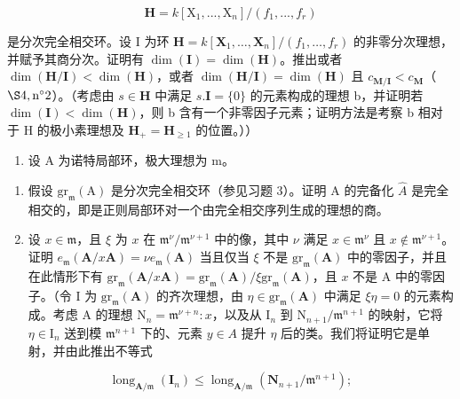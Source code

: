 \[
\mathbf {H} = k [ \mathrm{X} _ {1},..., \mathrm{X} _ {n} ] / (f _ {1},..., f _ {r})
\]

  是分次完全相交环。设 I 为环 \(\mathbf{H} = k[\mathbf{X}_1, \ldots, \mathbf{X}_n] / (f_1, \ldots, f_r)\) 的非零分次理想，并赋予其商分次。证明有 \(\dim(\mathbf{I}) = \dim(\mathbf{H})\)。推出或者 \(\dim(\mathbf{H}/\mathbf{I}) < \dim(\mathbf{H})\)，或者 \(\dim(\mathbf{H}/\mathbf{I}) = \dim(\mathbf{H})\) 且 \(c_{\mathbf{M}/\mathbf{I}} < c_{\mathbf{M}}\)（\(\S 4, \text{n}^{\circ} 2\)）。（考虑由 \(s \in \mathbf{H}\) 中满足 \(s.\mathbf{I} = \{0\}\) 的元素构成的理想 b，并证明若 \(\dim(\mathbf{I}) < \dim(\mathbf{H})\)，则 b 含有一个非零因子元素；证明方法是考察 b 相对于 H 的极小素理想及 \(\mathbf{H}_{+} = \mathbf{H}_{\geqslant 1}\) 的位置。））

\begin{enumerate}
\def\labelenumi{\arabic{enumi})}
\setcounter{enumi}{3}
\tightlist
\item
  设 A 为诺特局部环，极大理想为 m。
\end{enumerate}

\begin{enumerate}
\def\labelenumi{\alph{enumi})}
\item
  假设 \(\mathrm{gr}_{\mathfrak{m}}(\mathrm{A})\) 是分次完全相交环（参见习题 3）。证明 A 的完备化 \(\widehat{A}\) 是完全相交的，即是正则局部环对一个由完全相交序列生成的理想的商。
\item
  设 \(x \in \mathfrak{m}\)，且 \(\xi\) 为 \(x\) 在 \(\mathfrak{m}^{\nu}/\mathfrak{m}^{\nu+1}\) 中的像，其中 \(\nu\) 满足 \(x \in \mathfrak{m}^{\nu}\) 且 \(x \notin \mathfrak{m}^{\nu+1}\)。证明 \(e_{\mathfrak{m}}(\mathbf{A}/x\mathbf{A}) = \nu e_{\mathfrak{m}}(\mathbf{A})\) 当且仅当 \(\xi\) 不是 \(\mathrm{gr}_{\mathfrak{m}}(\mathbf{A})\) 中的零因子，并且在此情形下有 \(\mathrm{gr}_{\mathfrak{m}}(\mathbf{A}/x\mathbf{A}) = \mathrm{gr}_{\mathfrak{m}}(\mathbf{A})/\xi\mathrm{gr}_{\mathfrak{m}}(\mathbf{A})\)，且 \(x\) 不是 A 中的零因子。（令 I 为 \(\mathrm{gr}_{\mathfrak{m}}(\mathbf{A})\) 的齐次理想，由 \(\eta \in \mathrm{gr}_{\mathfrak{m}}(\mathbf{A})\) 中满足 \(\xi\eta = 0\) 的元素构成。考虑 A 的理想 \(\mathrm{N}_n = \mathfrak{m}^{\nu+n}:x\)，以及从 \(\mathrm{I}_n\) 到 \(\mathrm{N}_{n+1}/\mathfrak{m}^{n+1}\) 的映射，它将 \(\eta \in \mathrm{I}_n\) 送到模 \(\mathfrak{m}^{n+1}\) 下的、元素 \(y \in A\) 提升 \(\eta\) 后的类。我们将证明它是单射，并由此推出不等式
\end{enumerate}

\[
\operatorname{long} _ {\mathbf {A} / \mathfrak {m}} (\mathbf {I} _ {n}) \leqslant \operatorname{long} _ {\mathbf {A} / \mathfrak {m}} (\mathbf {N} _ {n + 1} / \mathfrak {m} ^ {n + 1});\tag{i}
\]

